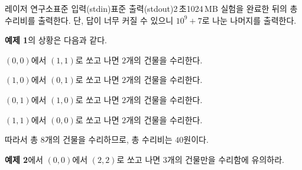 \begin{problem}{레이저 연구소}{표준 입력(stdin)}{표준 출력(stdout)}{2\,초}{1024\,MB}
\OutputFile
실험을 완료한 뒤의 총 수리비를 출력한다. 단, 답이 너무 커질 수 있으니 $10^{9}+7$로 나눈 나머지를 출력한다.

\Examples

\begin{example}
%
%
%
\end{example}

\Note

\textbf{예제 1}의 상황은 다음과 같다.

$\left(0, 0\right)$에서 $\left(1, 1\right)$로 쏘고 나면 $2$개의 건물을 수리한다.

$\left(1, 0\right)$에서 $\left(0, 1\right)$로 쏘고 나면 $2$개의 건물을 수리한다.

$\left(0, 1\right)$에서 $\left(1, 0\right)$로 쏘고 나면 $2$개의 건물을 수리한다.

$\left(1, 1\right)$에서 $\left(0, 0\right)$로 쏘고 나면 $2$개의 건물을 수리한다.

따라서 총 $8$개의 건물을 수리하므로, 총 수리비는 $40$원이다.

\textbf{예제 2}에서 $\left(0, 0\right)$에서 $\left(2, 2\right)$로 쏘고 나면 $3$개의 건물만을 수리함에 유의하라.

\end{problem}
